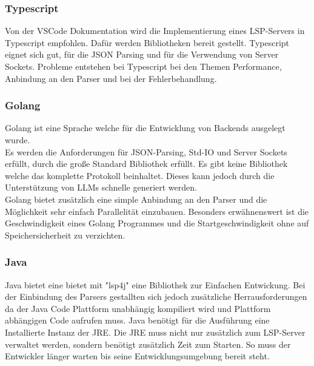 \documentclass[./einleitung.tex]{subfiles}
\begin{document}
\subsubsection{Typescript}
Von der VSCode Dokumentation wird die Implementierung eines LSP-Servers in Typescript empfohlen. Dafür werden Bibliotheken bereit gestellt.
Typescript eignet sich gut, für die JSON Parsing und für die Verwendung von Server Sockets. Probleme entstehen bei Typescript bei den Themen Performance, Anbindung an den Parser und bei der Fehlerbehandlung.

\subsubsection{Golang}
Golang ist eine Sprache welche für die Entwicklung von Backends ausgelegt wurde. \\
Es werden die Anforderungen für JSON-Parsing, Std-IO und Server Sockets erfüllt, durch die große Standard Bibliothek erfüllt. Es gibt keine Bibliothek welche das komplette Protokoll beinhaltet. Dieses kann jedoch durch die Unterstützung von LLMs schnelle generiert werden.\\
Golang bietet zusätzlich eine simple Anbindung an den Parser und die Möglichkeit sehr einfach Parallelität einzubauen. Besonders erwähnenswert ist die Geschwindigkeit eines Golang Programmes und die Startgeschwindigkeit ohne auf Speichersicherheit zu verzichten.

\subsubsection{Java}
Java bietet eine bietet mit "lsp4j" eine Bibliothek zur Einfachen Entwickung. 
Bei der Einbindung des Parsers gestallten sich jedoch zusätzliche Herrausforderungen da der Java Code Plattform unabhängig kompiliert wird und Plattform abhängigen Code aufrufen muss.
Java benötigt für die Ausführung eine Installierte Instanz der JRE. Die JRE muss nicht nur zusätzlich zum LSP-Server verwaltet werden, sondern benötigt zusätzlich Zeit zum Starten. So muss der Entwickler länger warten bis seine Entwicklungsumgebung bereit steht. 
\end{document}
